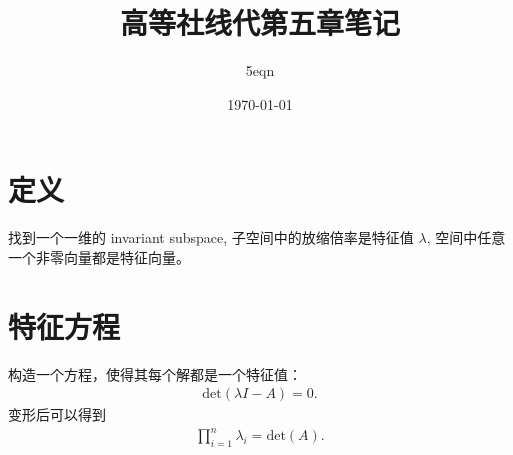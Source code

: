 \documentclass[UTF8,a4paper,11pt]{ctexart}
\title{高等社线代第五章笔记}
\author{5eqn}
\date{\today}
\begin{document}
  \maketitle
  \section{定义}
    找到一个一维的 invariant subspace,
    子空间中的放缩倍率是特征值 $\lambda$,
    空间中任意一个非零向量都是特征向量。
  \section{特征方程}
    构造一个方程，使得其每个解都是一个特征值：
    \[
    \begin{aligned}
      \mathrm{det}(\lambda I-A)=0
    .\end{aligned}
    \] 
    变形后可以得到
    \[
    \begin{aligned}
      \prod_{i=1}^{n} \lambda_i=\mathrm{det}(A)
    .\end{aligned}
    \] 
\end{document}
